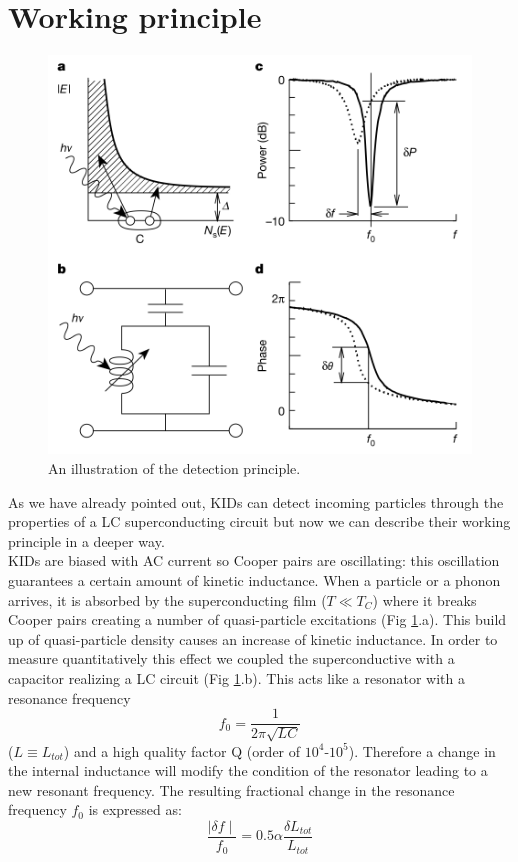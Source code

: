 \documentclass[12pt]{article}
\begin{document}
\section{Working principle}
\begin{figure}[H] 
        \centering \includegraphics[width=0.55\columnwidth]{Schermata 2021-06-08 alle 13.47.58.png}
        \caption{
                \label{fig:pric} An illustration of the detection principle.
        }
\end{figure}
As we have already pointed out, KIDs can detect incoming particles through the properties of a LC superconducting circuit but now we can describe their working principle in a deeper way.\\
KIDs are biased with AC current so Cooper pairs are oscillating: this oscillation guarantees a certain amount of kinetic inductance.
When a particle or a phonon arrives, it is absorbed by the superconducting film ($T \ll T_C$) where it breaks Cooper pairs creating a number of quasi-particle excitations (Fig \ref{fig:pric}.a). This build up of quasi-particle density causes an increase of kinetic inductance. In order to measure quantitatively this effect we coupled the superconductive with a capacitor realizing a LC circuit (Fig \ref{fig:pric}.b). This acts like a resonator with a resonance frequency 
\begin{equation}
f_0 = \frac{1}{2 \pi \sqrt{LC}}
\end{equation}
($L \equiv L_{tot}$) and a high quality factor Q (order of $10^4$-$10^5$). Therefore a change in the internal inductance will modify the condition of the resonator leading to a new resonant frequency. The resulting fractional change in the resonance frequency $f_0$ is expressed as:
\begin{equation}
    \frac{\mid \delta f \mid}{f_0} = 0.5 \alpha \frac{\delta L_{tot}}{L_{tot}}
\end{equation}
\end{document}
